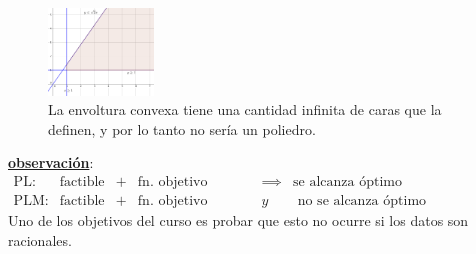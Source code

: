 \documentclass[10pt]{article}
\theoremstyle{plain}
\theoremstyle{definition}
\newcommand{\imp}{\implies}
\begin{document}
\begin{figure}[h]
\centering
\includegraphics[width=0.25\textwidth]{conv_S}
\caption{La envoltura convexa tiene una cantidad infinita de caras que la definen, y por lo tanto no sería un poliedro.}
\end{figure}
\underline{\textbf{observación}}: 
$$
\begin{array}{cccccc}
\text{PL:} & \text{factible} & + & \text{fn. objetivo acotada} &\imp & \text{se alcanza óptimo}\\
\text{PLM:} & \text{factible} & + & \text{fn. objetivo acotada} & y & \text{ no se alcanza óptimo necesariamente}
\end{array}
$$
Uno de los objetivos del curso es probar que esto no ocurre si los datos son racionales.
\end{document}
